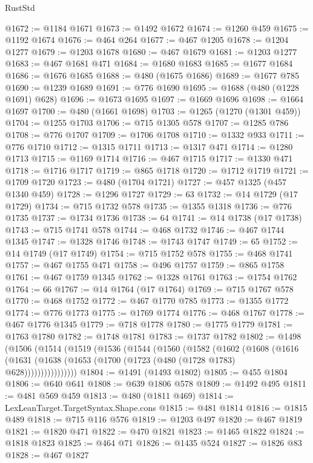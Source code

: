 \begin{lexlean}{RustStd}
\begin{coremodule}
@1672 := @1184 @1671
@1673 := @1492 @1672
@1674 := @1260 @459
@1675 := @1192 @1674
@1676 := @464 @264
@1677 := @467 @1205
@1678 := @1204 @1277
@1679 := @1203 @1678
@1680 := @467 @1679
@1681 := @1203 @1277
@1683 := @467 @1681 @471
@1684 := @1680 @1683
@1685 := @1677 @1684
@1686 := @1676 @1685
@1688 := @480 (@1675 @1686)
@1689 := @1677 @785
@1690 := @1239 @1689
@1691 := @776 @1690
@1695 := @1688 (@480 (@1228 @1691) @628)
@1696 := @1673 @1695
@1697 := @1669 @1696
@1698 := @1664 @1697
@1700 := @480 (@1661 @1698)
@1703 := @1265 (@1270 (@1301 @459))
@1704 := @1255 @1703
@1706 := @715 @1305 @578
@1707 := @1285 @786
@1708 := @776 @1707
@1709 := @1706 @1708
@1710 := @1332 @933
@1711 := @776 @1710
@1712 := @1315 @1711
@1713 := @1317 @471
@1714 := @1280 @1713
@1715 := @1169 @1714
@1716 := @467 @1715
@1717 := @1330 @471
@1718 := @1716 @1717
@1719 := @865 @1718
@1720 := @1712 @1719
@1721 := @1709 @1720
@1723 := @480 (@1704 @1721)
@1727 := @457 @1325 (@457 @1340 @459)
@1728 := @1296 @1727
@1729 := 63
@1732 := @14 @1729 (@17 @1729)
@1734 := @715 @1732 @578
@1735 := @1355 @1318
@1736 := @776 @1735
@1737 := @1734 @1736
@1738 := 64
@1741 := @14 @1738 (@17 @1738)
@1743 := @715 @1741 @578
@1744 := @468 @1732
@1746 := @467 @1744 @1345
@1747 := @1328 @1746
@1748 := @1743 @1747
@1749 := 65
@1752 := @14 @1749 (@17 @1749)
@1754 := @715 @1752 @578
@1755 := @468 @1741
@1757 := @467 @1755 @471
@1758 := @496 @1757
@1759 := @865 @1758
@1761 := @467 @1759 @1345
@1762 := @1328 @1761
@1763 := @1754 @1762
@1764 := 66
@1767 := @14 @1764 (@17 @1764)
@1769 := @715 @1767 @578
@1770 := @468 @1752
@1772 := @467 @1770 @785
@1773 := @1355 @1772
@1774 := @776 @1773
@1775 := @1769 @1774
@1776 := @468 @1767
@1778 := @467 @1776 @1345
@1779 := @718 @1778
@1780 := @1775 @1779
@1781 := @1763 @1780
@1782 := @1748 @1781
@1783 := @1737 @1782
@1802 := @1498
    (@1506
      (@1514
        (@1519
          (@1536
            (@1544
              (@1560
                (@1582
                  (@1602
                    (@1608
                      (@1616
                        (@1631 (@1638 (@1653 (@1700 (@1723 (@480 (@1728 @1783) @628))))))))))))))))
@1804 := @1491 (@1493 @1802)
@1805 := @455 @1804
@1806 := @640 @641
@1808 := @639 @1806 @578
@1809 := @1492 @495
@1811 := @481 @569 @459
@1813 := @480 (@1811 @469)
@1814 := LexLeanTarget.TargetSyntax.Shape.cons
@1815 := @481 @1814
@1816 := @1815 @489
@1818 := @715 @116 @576
@1819 := @1203 @497
@1820 := @467 @1819
@1821 := @1820 @471
@1822 := @470 @1821
@1823 := @1465 @1822
@1824 := @1818 @1823
@1825 := @464 @71
@1826 := @1435 @524
@1827 := @1826 @83
@1828 := @467 @1827

\end{coremodule}
\end{lexlean}
